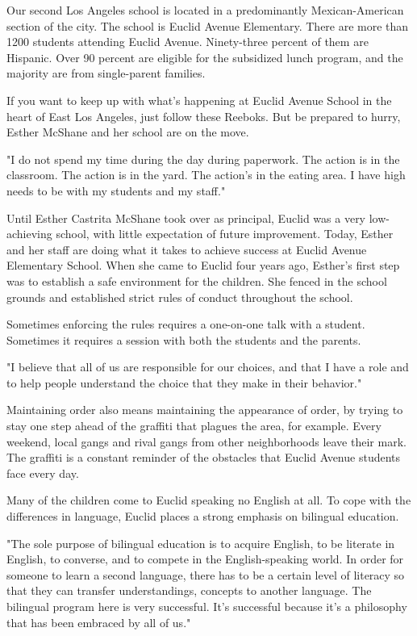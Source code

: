 Our second Los Angeles school is located in a predominantly Mexican-American section of the city. The school is Euclid Avenue Elementary. There are more than 1200 students attending Euclid Avenue. Ninety-three percent of them are Hispanic. Over 90 percent are eligible for the subsidized lunch program, and the majority are from single-parent families.

If you want to keep up with what's happening at Euclid Avenue School in the heart of East Los Angeles, just follow these Reeboks. But be prepared to hurry, Esther McShane and her school are on the move.

"I do not spend my time during the day during paperwork. The action is in the classroom. The action is in the yard. The action's in the eating area. I have high needs to be with my students and my staff."

Until Esther Castrita McShane took over as principal, Euclid was a very low-achieving school, with little expectation of future improvement. Today, Esther and her staff are doing what it takes to achieve success at Euclid Avenue Elementary School. When she came to Euclid four years ago, Esther's first step was to establish a safe environment for the children. She fenced in the school grounds and established strict rules of conduct throughout the school.

Sometimes enforcing the rules requires a one-on-one talk with a student. Sometimes it requires a session with both the students and the parents.

"I believe that all of us are responsible for our choices, and that I have a role and to help people understand the choice that they make in their behavior."

Maintaining order also means maintaining the appearance of order, by trying to stay one step ahead of the graffiti that plagues the area, for example. Every weekend, local gangs and rival gangs from other neighborhoods leave their mark. The graffiti is a constant reminder of the obstacles that Euclid Avenue students face every day.

Many of the children come to Euclid speaking no English at all. To cope with the differences in language, Euclid places a strong emphasis on bilingual education.

"The sole purpose of bilingual education is to acquire English, to be literate in English, to converse, and to compete in the English-speaking world. In order for someone to learn a second language, there has to be a certain level of literacy so that they can transfer understandings, concepts to another language. The bilingual program here is very successful. It's successful because it's a philosophy that has been embraced by all of us."

